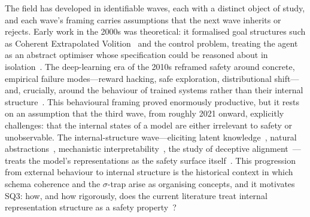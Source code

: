 The field has developed in identifiable waves, each with a distinct object of study, and each wave's framing carries assumptions that the next wave inherits or rejects. Early work in the 2000s was theoretical: it formalised goal structures such as Coherent Extrapolated Volition~\cite{yudkowsky2004cev} and the control problem, treating the agent as an abstract optimiser whose specification could be reasoned about in isolation~\cite{bostrom2014superintelligence,soares2015corrigibility}. The deep-learning era of the 2010s reframed safety around concrete, empirical failure modes---reward hacking, safe exploration, distributional shift---and, crucially, around the behaviour of trained systems rather than their internal structure~\cite{amodei2016concrete,hendrycks2021unsolved,hubinger2019risks}. This behavioural framing proved enormously productive, but it rests on an assumption that the third wave, from roughly 2021 onward, explicitly challenges: that the internal states of a model are either irrelevant to safety or unobservable. The internal-structure wave---eliciting latent knowledge~\cite{christiano2021elk}, natural abstractions~\cite{wentworth2020natural}, mechanistic interpretability~\cite{bereska2024mechanistic}, the study of deceptive alignment~\cite{hubinger2024sleeper}---treats the model's representations as the safety surface itself~\cite{huvard2023notion}. This progression from external behaviour to internal structure is the historical context in which schema coherence and the $\sigma$-trap arise as organising concepts, and it motivates SQ3: how, and how rigorously, does the current literature treat internal representation structure as a safety property~\cite{amsyar2026sigma}?

